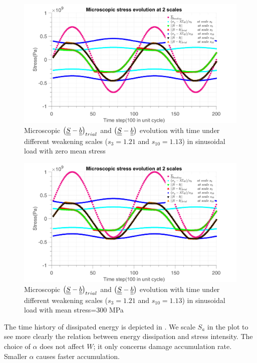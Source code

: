 \begin{figure}[!h]
\centering
\includegraphics[width=\textwidth]{figures//trialsin_0.png} 
\caption{Microscopic $\left(  \uline{\uline{S}}-\uline{\uline{b}}\right)_{trial}$ and $\left( \uline{\uline{S}}-\uline{\uline{b}}\right)$ evolution with time under different weakening scales ($s_{3}=1.21$ and $s_{10}=1.13$) in sinusoidal load with zero mean stress}
\label{fig.trialsin0}
\end{figure}
\begin{figure}[!h]
\centering
\includegraphics[width=\textwidth]{figures//trialsin_m.png} 
\caption{Microscopic $\left(  \uline{\uline{S}}-\uline{\uline{b}}\right)_{trial}$ and $\left( \uline{\uline{S}}-\uline{\uline{b}}\right)$ evolution with time under different weakening scales ($s_{3}=1.21$ and $s_{10}=1.13$) in sinusoidal load with mean stress=300 MPa}
\label{fig.trialsinm}
\end{figure}

The time history of dissipated energy is depicted in . We scale $S_{a}$ in the plot to see more clearly the relation between energy dissipation and stress intensity. The choice of $\alpha$ does not affect $W$; it only concerns damage accumulation rate. Smaller $\alpha$ causes faster accumulation.

